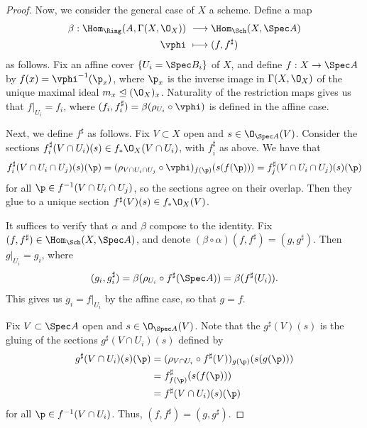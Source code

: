 \documentclass[12pt]{amsart}
\begin{document}
\begin{proof}
  Now, we consider the general case of $X$ a scheme. 
  Define a map 
  \begin{align*}
    \beta:\Hom_{\Ring}(A,\Gamma(X,\O_X))&~\longrightarrow \Hom_{\Sch}(X,\Spec A) \\
    \vphi&~\longmapsto (f,f^\sharp)
  \end{align*}
  as follows.
  Fix an affine cover $\{U_i=\Spec B_i\}$ of $X$, and define $f:X\to \Spec A$ by $f(x)=\vphi^{-1}(\p_x)$, where $\p_x$ is the inverse image in $\Gamma(X,\O_X)$ of the unique maximal ideal $m_x\trianglelefteq(\O_X)_x$.
  Naturality of the restriction maps gives us that $f|_{U_i}=f_i$, where $(f_i,f_i^\sharp)=\beta(\rho_{U_i}\circ \vphi)$ is defined in the affine case.
  
  Next, we define $f^\sharp$ as follows.
  Fix $V\subset X$ open and $s\in \O_{\Spec A}(V)$.
  Consider the sections $f^\sharp_i(V\cap U_i)(s)\in f_*\O_X(V\cap U_i)$, with $f^\sharp_i$ as above.
  We have that 
  \begin{align*}
    f^\sharp_i(V\cap U_i\cap U_j)(s)(\p) 
    = (\rho_{V\cap U_i\cap U_j}\circ \vphi)_{f(\p)} (s(f(\p)))
    = f^\sharp_j(V\cap U_i\cap U_j)(s)(\p) 
  \end{align*}
  for all $\p\in f^{-1}(V\cap U_i\cap U_j)$, so the sections agree on their overlap.
  Then they glue to a unique section $f^\sharp(V)(s)\in f_*\O_X(V)$.
  
  It suffices to verify that $\alpha$ and $\beta$ compose to the identity.
  Fix $(f,f^\sharp)\in \Hom_{\Sch}(X,\Spec A)$, and denote $(\beta\circ \alpha)(f,f^\sharp)=(g,g^\sharp)$.
  Then $g|_{U_i} = g_i$, where 
  \[
    (g_i,g_i^\sharp)= \beta(\rho_{U_i}\circ f^\sharp(\Spec A)) = \beta(f^\sharp(U_i)).
  \]
  This gives us $g_i=f|_{U_i}$ by the affine case, so that $g=f$. 

  Fix $V\subset \Spec A$ open and $s\in \O_{\Spec A}(V)$. 
  Note that the $g^\sharp(V)(s)$ is the gluing of the sections $g^\sharp(V\cap U_i)(s)$ defined by
  \begin{align*}
    g^\sharp(V\cap U_i)(s)(\p)
    &=(\rho_{V\cap U_i}\circ f^\sharp(V))_{g(\p)} (s(g(\p))) \\
    &= f^\sharp_{f(\p)}(s(f(\p))) \\
    &= f^\sharp(V\cap U_i)(s)(\p)
  \end{align*}
  for all $\p\in f^{-1}(V\cap U_i)$.
  Thus, $(f,f^\sharp)=(g,g^\sharp)$.


\end{proof}
\end{document}
